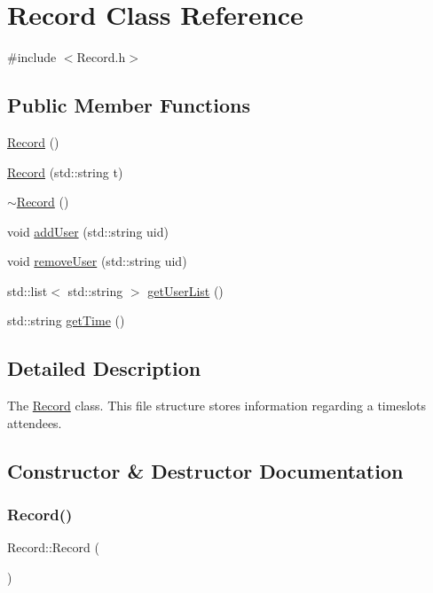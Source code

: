 \hypertarget{class_record}{}\section{Record Class Reference}
\label{class_record}


{\ttfamily \#include $<$Record.\+h$>$}

\subsection*{Public Member Functions}
\begin{DoxyCompactItemize}
\item 
\mbox{\hyperlink{class_record_ae8ee53ffec6ff4dac9911517d47e86a5}{Record}} ()
\item 
\mbox{\hyperlink{class_record_af1432c95bf127a6a3b202dcb5402397f}{Record}} (std\+::string t)
\item 
\mbox{\hyperlink{class_record_ad2ce1a99d866834ab53dedd788cb1ea6}{$\sim$\+Record}} ()
\item 
void \mbox{\hyperlink{class_record_a3f5f6ec6daac3aa600385e14c583dc32}{add\+User}} (std\+::string uid)
\item 
void \mbox{\hyperlink{class_record_ac52545295427a5923912f0ad4cdc4620}{remove\+User}} (std\+::string uid)
\item 
std\+::list$<$ std\+::string $>$ \mbox{\hyperlink{class_record_a79bd038b2a7c898441d8d638013640f9}{get\+User\+List}} ()
\item 
std\+::string \mbox{\hyperlink{class_record_ac34565295efe3cbae2d5204b046aa258}{get\+Time}} ()
\end{DoxyCompactItemize}


\subsection{Detailed Description}
The \mbox{\hyperlink{class_record}{Record}} class. This file structure stores information regarding a timeslot\textquotesingle{}s attendees. 

\subsection{Constructor \& Destructor Documentation}
\mbox{\label{class_record_ae8ee53ffec6ff4dac9911517d47e86a5}} 
\subsubsection{\texorpdfstring{Record()}{Record()}\hspace{0.1cm}{\footnotesize\ttfamily [1/2]}}
{\footnotesize\ttfamily Record\+::\+Record (\begin{DoxyParamCaption}{ }\end{DoxyParamCaption})}

